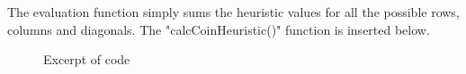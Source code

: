 \documentclass[11pt, a4paper]{article}
\begin{document}
The evaluation function simply sums the heuristic values for all the possible rows, columns and diagonals. The "calcCoinHeuristic()" function is inserted below.

\begin{figure}

\caption{ Excerpt of code}\label{StateEvolved}
\end{figure}
\end{document}
